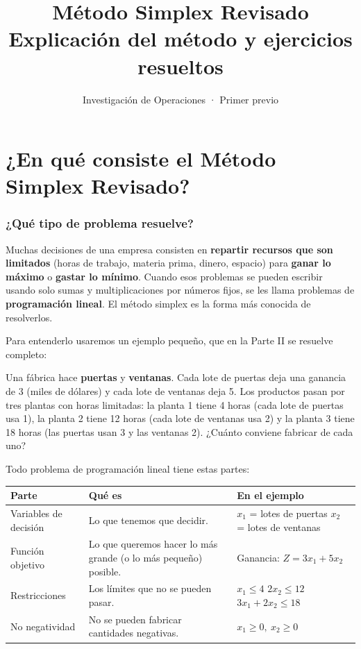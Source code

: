 \documentclass[11pt,a4paper]{article}
\title{\textbf{Método Simplex Revisado}\\[4pt]\large Explicación del método y ejercicios resueltos}
\author{Investigación de Operaciones · Primer previo}
\date{}
\begin{document}
\maketitle
\tableofcontents
\newpage

\part{¿En qué consiste el Método Simplex Revisado?}

\section{¿Qué tipo de problema resuelve?}

Muchas decisiones de una empresa consisten en \textbf{repartir recursos que son limitados} (horas de trabajo,
materia prima, dinero, espacio) para \textbf{ganar lo máximo} o \textbf{gastar lo mínimo}. Cuando esos problemas
se pueden escribir usando solo sumas y multiplicaciones por números fijos, se les llama problemas de
\textbf{programación lineal}. El método simplex es la forma más conocida de resolverlos.

Para entenderlo usaremos un ejemplo pequeño, que en la Parte II se resuelve completo:

\begin{ojo}
Una fábrica hace \textbf{puertas} y \textbf{ventanas}. Cada lote de puertas deja una ganancia de 3 (miles de
dólares) y cada lote de ventanas deja 5. Los productos pasan por tres plantas con horas limitadas:
la planta 1 tiene 4 horas (cada lote de puertas usa 1), la planta 2 tiene 12 horas (cada lote de ventanas usa 2)
y la planta 3 tiene 18 horas (las puertas usan 3 y las ventanas 2). ¿Cuánto conviene fabricar de cada uno?
\end{ojo}

Todo problema de programación lineal tiene estas partes:

\begin{center}\small
\begin{tabular}{p{3.4cm}p{6.2cm}p{4.6cm}}
\toprule
\textbf{Parte} & \textbf{Qué es} & \textbf{En el ejemplo} \\
\midrule
Variables de decisión & Lo que tenemos que decidir. & $x_1$ = lotes de puertas \newline $x_2$ = lotes de ventanas \\
Función objetivo & Lo que queremos hacer lo más grande (o lo más pequeño) posible. & Ganancia: $Z = 3x_1 + 5x_2$ \\
Restricciones & Los límites que no se pueden pasar. & $x_1 \le 4$ \newline $2x_2 \le 12$ \newline $3x_1 + 2x_2 \le 18$ \\
No negatividad & No se pueden fabricar cantidades negativas. & $x_1 \ge 0,\ x_2 \ge 0$ \\
\bottomrule
\end{tabular}
\end{center}
\end{document}
